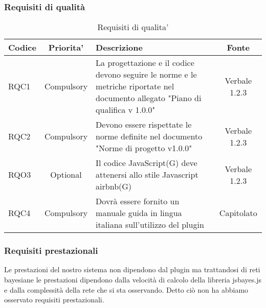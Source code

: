         \subsubsection{Requisiti di qualità}
        
        \begin{table}[h!]
            \centering
            \renewcommand{\arraystretch}{1.5} %
            \begin{tabular}{|l|c|p{8cm}|c|} %
                \rowcolor{orange!50} %
        		\hline
        		\textbf{Codice} & \textbf{Priorita'} & \textbf{Descrizione} & \textbf{Fonte}\\
                \hline
                RQC1 &  Compulsory & La  progettazione e il codice devono seguire le norme e le metriche riportate nel documento allegato "Piano di qualifica v 1.0.0" & Verbale 1.2.3\\
                \hline
                RQC2 &  Compulsory & Devono essere rispettate le norme definite nel documento "Norme di progetto v1.0.0" & Verbale 1.2.3\\
                \hline
                RQO3 &  Optional & Il codice JavaScript(G) deve attenersi allo stile Javascript airbnb(G) & Verbale 1.2.3\\
                \hline
                RQC4 &  Compulsory & Dovrà essere fornito un manuale guida in lingua italiana sull'utilizzo del plugin & Capitolato\\
                \hline
            \end{tabular}
            \caption{Requisiti di qualita'} %
            \label{tab:my_label}
        \end{table}
        
        
        \subsubsection{Requisiti prestazionali}
        Le prestazioni del nostro sistema non dipendono dal plugin ma trattandosi di reti bayesiane le prestazioni dipendono dalla velocità di calcolo della libreria jsbayes.js e dalla complessità della rete che si sta osservando. Detto ciò non ha abbiamo osservato requisiti prestazionali.
